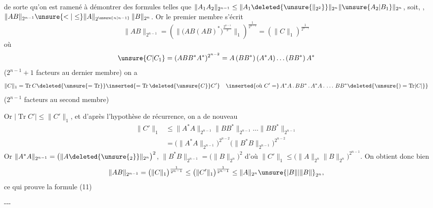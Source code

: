 de sorte qu'on est ramené à démontrer des formules telles que
$\|A_1 A_2\|_{2^{n-1}}\leq\|A_1\deleted{\unsure{\|_{2^2}}}\|_{2^n}\|\unsure{A_2|B_1}\|_{2^n}$, soit, ,
\uline{$\|AB\|_{2^{n-1}}\unsure{<|\leq}\|A\|_{2^{\unsure{n|n-1}}}\,\|B\|_{2^n}$}.
Or le premier membre s'écrit
\[
\|AB\|_{2^{n-1}}=\left(\bigl\|\bigl(AB(AB)^*\bigr)^{\frac{2^{n-1}}{2}}\bigr\|_1\right)^{\frac1{2^{n-1}}}
=\left(\|C\|_1\right)^{\frac1{2^{n-1}}}
\]
où
\[
\unsure{C|C_1}=(ABB^*A^*)^{2^{n-2}}=A\,(BB^*)\,(A^*A)\ldots(BB^*)\,A^*
\]
($2^{n-1}+1$ facteurs au dernier membre) on a
\[
\|C\|_1=\operatorname{Tr} C\deleted{\unsure{=\operatorname{Tr}}}\inserted{=\operatorname{Tr}\deleted{\unsure{C}}C'}\quad
\inserted{\text{où }C'=}\, A^*A\,.\,BB^*\,.\,A^*A\,.\,\ldots\,BB^*\deleted{\unsure{)=\operatorname{Tr}\lvert C\rvert}}
\]
($2^{n-1}$ facteurs au second membre)

Or $|\operatorname{Tr} C'|\leq\|C'\|_1$, et d'après l'hypothèse de récurrence, on a de nouveau
\[
\begin{aligned}
\|C'\|_1&\leq\|A^*A\|_{2^{n-1}}\|BB^*\|_{2^{n-1}}\ldots\|BB^*\|_{2^{n-1}}\\
&=\bigl(\|A^*A\|_{2^{n-1}}\bigr)^{2^{n-2}}\bigl(\|B^*B\|_{2^{n-1}}\bigr)^{2^{n-2}}
\end{aligned}
\]
Or $\|A^*A\|_{2^{n-1}}=\bigl(\|A\deleted{\unsure{_2}}\|_{2^n}\bigr)^2$,
$\|B^*B\|_{2^{n-1}}=\bigl(\|B\|_{2^n}\bigr)^2$
d'où $\|C'\|_1\leq\bigl(\|A\|_{2^n}\|B\|_{2^n}\bigr)^{2^{n-1}}$. On obtient donc bien
\[
\|AB\|_{2^{n-1}}=\bigl(\|C\|_1\bigr)^{\frac1{2^{n-1}}}
\leq\bigl(\|C'\|_1\bigr)^{\frac1{2^{n-1}}}\leq\|A\|_{2^n}\unsure{\lvert B\||\|B\|}_{2^n},
\]
ce qui prouve la formule (11)

\medskip\noindent\hspace*{2em}-\enspace-\enspace-
